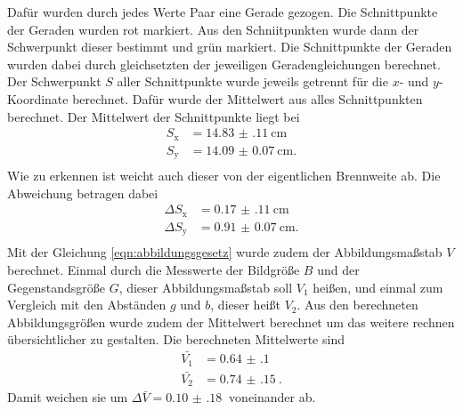 Dafür wurden durch jedes Werte Paar eine Gerade gezogen.
Die Schnittpunkte der Geraden wurden rot markiert.
Aus den Schniitpunkten wurde dann der Schwerpunkt dieser bestimmt und grün markiert.
Die Schnittpunkte der Geraden wurden dabei durch gleichsetzten der jeweiligen Geradengleichungen berechnet.
Der Schwerpunkt $S$ aller Schnittpunkte wurde jeweils getrennt für die $x$- und $y$-Koordinate berechnet.
Dafür wurde der Mittelwert aus alles Schnittpunkten berechnet.
Der Mittelwert der Schnittpunkte liegt bei 
\begin{align*}
    S_\text{x} & =  \SI{14.83(11)}{\centi\meter}\\
    S_\text{y} & =  \SI{14.09(7)}{\centi\meter}. \\
\end{align*}
Wie zu erkennen ist weicht auch dieser von der eigentlichen Brennweite ab.
Die Abweichung betragen dabei 
\begin{align*}
   \Delta S_\text{x} & =  \SI{0.17(11)}{\centi\meter} \\
    \Delta S_\text{y} & =  \SI{0.91(7)}{\centi\meter}. \\
\end{align*}
Mit der Gleichung \eqref{eqn:abbildungsgesetz} wurde zudem der Abbildungsmaßstab $V$ berechnet.
Einmal durch die Messwerte der Bildgröße $B$ und der Gegenstandsgröße $G$, dieser Abbildungsmaßstab soll $V_1$ heißen, und einmal zum Vergleich mit den Abständen $g$ und $b$, dieser heißt $V_2$.
Aus den berechneten Abbildungsgrößen wurde zudem der Mittelwert berechnet um das weitere rechnen übersichtlicher zu gestalten.
Die berechneten Mittelwerte sind 
\begin{align*}
    \bar{V_1} & =  \SI{0.64(10)}{}\\
    \bar{V_2} & =  \SI{0.74(15)}{}.
\end{align*}
Damit weichen sie um $\Delta \bar{V} = \SI{0.10(18)}{}$ voneinander ab.

